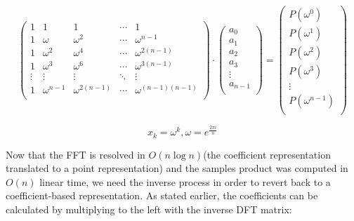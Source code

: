 \documentclass[letterpaper]{article}
\begin{document}
$$
 \begin{pmatrix}
   1 & 1 & 1 &\cdots & 1 \\
   1 & \omega & \omega^2 &\cdots & \omega^{n - 1} \\
   1 & \omega^2 & \omega^4 &\cdots & \omega^{2(n - 1)} \\
   1 & \omega^3 & \omega^6 &\cdots & \omega^{3(n - 1)} \\
   \vdots  & \vdots  & \vdots & \ddots  & \vdots \\
   1 & \omega^{n-1} & \omega^{2(n - 1)} &\cdots & \omega^{(n-1)(n-1)} \\
 \end{pmatrix}
 \cdot
 \begin{pmatrix}
 a_{0} \\
 a_{1} \\
 a_{2} \\
 a_{3} \\
 \vdots \\
 a_{n - 1} \\
 \end{pmatrix}
 =
 \begin{pmatrix}
 P(\omega^0) \\
 P(\omega^1) \\
 P(\omega^2) \\
 P(\omega^3) \\
 \vdots \\
 P(\omega^{n - 1}) \\
 \end{pmatrix}
$$

$$
x_{k} = \omega^k, \omega = e^{\frac{2\pi i}{n}}
$$

Now that the FFT is resolved in $O(n \log n)$(the coefficient representation translated to a point representation) and the samples product was computed in $O(n)$ linear time, we need the inverse process in order to revert back to a coefficient-based representation. As stated earlier, the coefficients can be calculated by multiplying to the left with the inverse DFT matrix:
\end{document}
